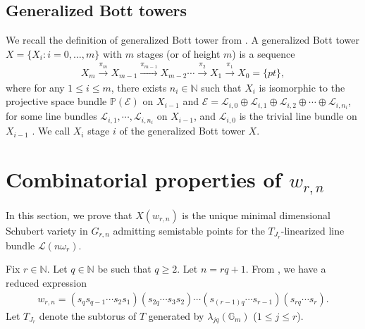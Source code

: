 \documentclass[12pt,reqno]{amsart}
\numberwithin{equation}{section}
\theoremstyle{definition}
\begin{document}
\subsection{Generalized Bott towers} \label{subsection 2.2}We recall the definition of generalized Bott tower from \cite[A.2, Page 144]{Bott tower}. A generalized Bott tower $X=\{X_{i}:i=0,\ldots,m\}$ with $m$ stages (or of height $m$) is a sequence
\begin{align*}
	X_{m}\xrightarrow{\text{$\pi_m$}}X_{m-1}\xrightarrow{\text{$\pi_{m-1}$}}X_{m-2}\cdots\xrightarrow{\text{$\pi_2$}}X_{1}\xrightarrow{\text{$\pi_{1}$}}X_{0}=\{pt\},
\end{align*}
where for any $1\leq i\leq m$, there exists $n_{i}\in\mathbb{N}$ such that $X_{i}$ is isomorphic to the projective space bundle $\mathbb{P}(\mathcal{E})$ on $X_{i-1}$ and $\mathcal{E}=\mathcal{L}_{i,0}\oplus\mathcal{L}_{i,1}\oplus\mathcal{L}_{i,2}\oplus\cdots\oplus\mathcal{L}_{i,n_{i}}$, for some line bundles $\mathcal{L}_{i,1},\cdots,\mathcal{L}_{i,n_{i}}$ on $X_{i-1}$, and $\mathcal{L}_{i,0}$ is the trivial line bundle on $X_{i-1}$ . We call  $X_{i}$ stage $i$ of the generalized Bott tower $X$.
\section{Combinatorial properties of $w_{r,n}$} In this section, we prove that $X(w_{r,n})$ is the unique minimal dimensional Schubert variety in $G_{r,n}$ admitting semistable points  for the $T_{J_{r}}$-linearized line bundle $\mathcal{L}(n\omega_{r})$.

Fix $r\in\mathbb{N}$. Let $q\in\mathbb{N}$ be such that $q\geq 2$. Let $n=rq+1$. 
 From \cite[Lemma 2.7]{sskannan}, we have 
a reduced expression 
\begin{align*}
	w_{r,n}=(s_{q}s_{q-1}\cdots s_{2}s_{1})(s_{2q}\cdots s_{3}s_{2})\cdots (s_{(r-1)q}\cdots s_{r-1})(s_{rq}\cdots s_{r}).
\end{align*}
Let $T_{J_{r}}$ denote the subtorus of $T$ generated by $\lambda_{jq}(\mathbb{G}_{m})$ ($1\leq j\leq r$).
\end{document}
